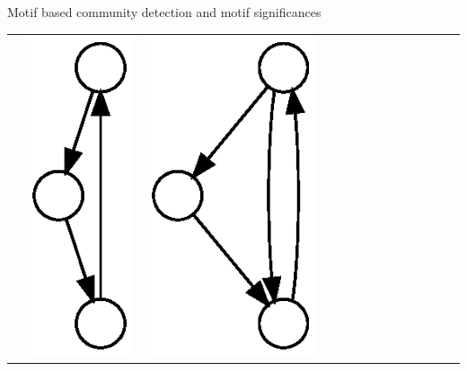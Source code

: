 \documentclass[unknownkeysallowed]{beamer}
\begin{document}
\begin{frame}{Motif based community detection and motif significances}
  \centering
  \begin{tabular}{l|lllllllllllll}
    \hline\noalign{\smallskip}
    &
    \includegraphics[height=0.10\textheight]{M1-plain} &
    \includegraphics[height=0.10\textheight]{M2-plain} &

\end{tabular}
\end{frame}
\end{document}
